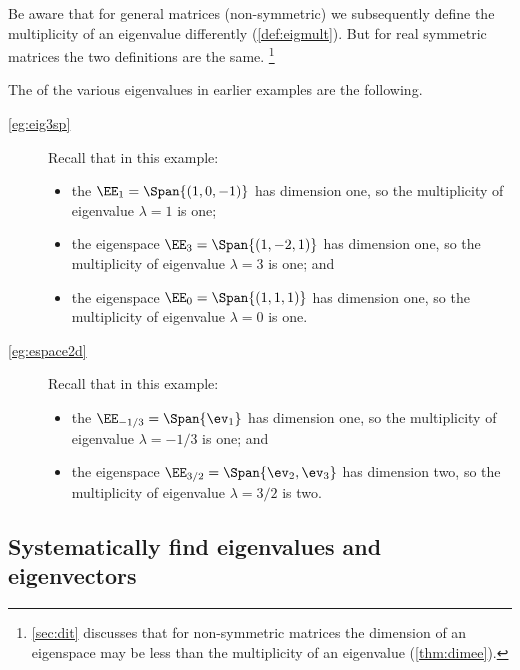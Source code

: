 Be aware that for general matrices (non-symmetric) we subsequently define the multiplicity of an eigenvalue differently (\cref{def:eigmult}).  
But for real symmetric matrices the two definitions are the same.%
\footnote{\cref{sec:dit} discusses that for non-symmetric matrices the dimension of an eigenspace may be less than the multiplicity of an eigenvalue (\cref{thm:dimee}).}



\begin{example} 
The  of the various eigenvalues in earlier examples are the following.
\begin{description}
\item[\cref{eg:eig3sp}] Recall that in this example:
\begin{itemize}
\item the  \(\EE_1=\Span\{(1,0,-1)\}\) has dimension one, so the multiplicity of eigenvalue \(\lambda=1\) is one;
\item the eigenspace \(\EE_3=\Span\{(1,-2,1)\}\) has dimension one, so the multiplicity of eigenvalue \(\lambda=3\) is one; and
\item the eigenspace \(\EE_0=\Span\{(1,1,1)\}\) has dimension one, so the multiplicity of eigenvalue \(\lambda=0\) is one.
\end{itemize}

\item[\cref{eg:espace2d}] Recall that in this example: 
\begin{itemize}
\item the  \(\EE_{-1/3}=\Span\{\ev_1\}\) has dimension one, so the multiplicity of eigenvalue \(\lambda=-1/3\) is one; and
\item the eigenspace \(\EE_{3/2}=\Span\{\ev_2,\ev_3\}\) has dimension two, so the multiplicity of eigenvalue \(\lambda=3/2\) is two.
\aqed
\end{itemize}

\end{description}
\end{example}














\subsection{Systematically find eigenvalues and eigenvectors}

